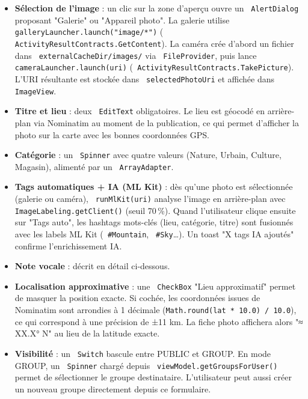 \documentclass[a4paper,12pt,openany]{report}
\newcommand{\ic}[1]{\texttt{\small\colorbox{lightbg}{\color{navy!90} #1}}}
\begin{document}
\begin{itemize}
  \item \textbf{Sélection de l'image} : un clic sur la zone d'aperçu ouvre un
    \ic{AlertDialog} proposant "Galerie" ou "Appareil photo". La galerie utilise
    \ic{galleryLauncher.launch("image/*")} (\ic{ActivityResultContracts.GetContent}).
    La caméra crée d'abord un fichier dans \ic{externalCacheDir/images/} via
    \ic{FileProvider}, puis lance \ic{cameraLauncher.launch(uri)}
    (\ic{ActivityResultContracts.TakePicture}). L'URI résultante est stockée
    dans \ic{selectedPhotoUri} et affichée dans \ic{ImageView}.

  \item \textbf{Titre et lieu} : deux \ic{EditText} obligatoires. Le lieu est
    géocodé en arrière-plan via Nominatim au moment de la publication, ce qui
    permet d'afficher la photo sur la carte avec les bonnes coordonnées GPS.

  \item \textbf{Catégorie} : un \ic{Spinner} avec quatre valeurs (Nature,
    Urbain, Culture, Magasin), alimenté par un \ic{ArrayAdapter}.

  \item \textbf{Tags automatiques + IA (ML Kit)} : dès qu'une photo est
    sélectionnée (galerie ou caméra), \ic{runMlKit(uri)} analyse l'image en
    arrière-plan avec \ic{ImageLabeling.getClient()} (seuil 70\,\%). Quand
    l'utilisateur clique ensuite sur "Tags auto", les hashtags mots-clés
    (lieu, catégorie, titre) sont fusionnés avec les labels ML Kit
    (\ic{\#Mountain}, \ic{\#Sky}…). Un toast "X tags IA ajoutés"
    confirme l'enrichissement IA.

  \item \textbf{Note vocale} : décrit en détail ci-dessous.

  \item \textbf{Localisation approximative} : une \ic{CheckBox}
    "Lieu approximatif" permet de masquer la position exacte. Si cochée,
    les coordonnées issues de Nominatim sont arrondies à 1 décimale
    (\texttt{Math.round(lat * 10.0) / 10.0}), ce qui correspond à une
    précision de ±11 km. La fiche photo affichera alors "≈ XX.X° N"
    au lieu de la latitude exacte.

  \item \textbf{Visibilité} : un \ic{Switch} bascule entre PUBLIC et GROUP.
    En mode GROUP, un \ic{Spinner} chargé depuis \ic{viewModel.getGroupsForUser()}
    permet de sélectionner le groupe destinataire. L'utilisateur peut aussi
    créer un nouveau groupe directement depuis ce formulaire.
\end{itemize}
\end{document}
